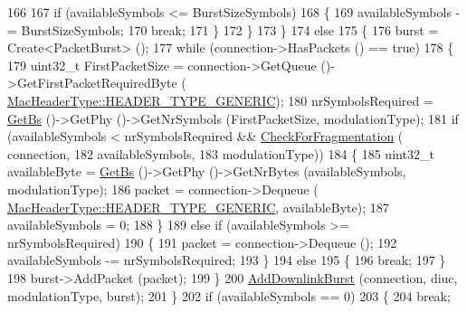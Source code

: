 \begin{DoxyCode}
166 
167               \textcolor{keywordflow}{if} (availableSymbols <= BurstSizeSymbols)
168                 \{
169                   availableSymbols -= BurstSizeSymbols; 
170                   \textcolor{keywordflow}{break};
171                 \}
172             \}
173         \}
174       \textcolor{keywordflow}{else}
175         \{
176           burst = Create<PacketBurst> ();
177           \textcolor{keywordflow}{while} (connection->HasPackets () == \textcolor{keyword}{true})
178             \{
179               uint32\_t FirstPacketSize = connection->GetQueue ()->GetFirstPacketRequiredByte (
      \hyperlink{classns3_1_1MacHeaderType_a54d8fc8bc93a2b7865627965cdd31c20a48fe5b2f20cadf78008c71469b518403}{MacHeaderType::HEADER\_TYPE\_GENERIC});
180               nrSymbolsRequired = \hyperlink{classns3_1_1BSScheduler_a8b09065ac8f74cb35446af55128e41c7}{GetBs} ()->GetPhy ()->GetNrSymbols (FirstPacketSize, modulationType);
181               \textcolor{keywordflow}{if} (availableSymbols < nrSymbolsRequired && \hyperlink{classns3_1_1BSScheduler_aedd94450afdda0371fae56e05624bfaf}{CheckForFragmentation} (
      connection,
182                                                                                  availableSymbols,
183                                                                                  modulationType))
184                 \{
185                   uint32\_t availableByte = \hyperlink{classns3_1_1BSScheduler_a8b09065ac8f74cb35446af55128e41c7}{GetBs} ()->GetPhy ()->GetNrBytes (availableSymbols, 
      modulationType);
186                   packet = connection->Dequeue (
      \hyperlink{classns3_1_1MacHeaderType_a54d8fc8bc93a2b7865627965cdd31c20a48fe5b2f20cadf78008c71469b518403}{MacHeaderType::HEADER\_TYPE\_GENERIC}, availableByte);
187                   availableSymbols = 0;
188                 \}
189               \textcolor{keywordflow}{else} \textcolor{keywordflow}{if} (availableSymbols >= nrSymbolsRequired)
190                 \{
191                   packet = connection->Dequeue ();
192                   availableSymbols -= nrSymbolsRequired;
193                 \}
194               \textcolor{keywordflow}{else}
195                 \{
196                   \textcolor{keywordflow}{break};
197                 \}
198               burst->AddPacket (packet);
199             \}
200           \hyperlink{classns3_1_1BSSchedulerSimple_af79d1e83a763249efdb65d62173442cd}{AddDownlinkBurst} (connection, diuc, modulationType, burst);
201         \}
202       \textcolor{keywordflow}{if} (availableSymbols == 0)
203         \{
204           \textcolor{keywordflow}{break};

\end{DoxyCode}
